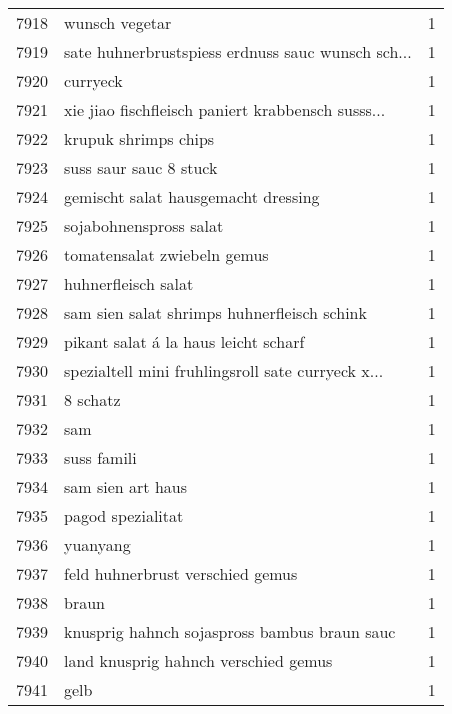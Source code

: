 \begin{tabular}{llr}
7918 &                                     wunsch vegetar &      1 \\
7919 &  sate huhnerbrustspiess erdnuss sauc wunsch sch... &      1 \\
7920 &                                           curryeck &      1 \\
7921 &  xie jiao fischfleisch paniert krabbensch susss... &      1 \\
7922 &                               krupuk shrimps chips &      1 \\
7923 &                             suss saur sauc 8 stuck &      1 \\
7924 &                gemischt salat hausgemacht dressing &      1 \\
7925 &                             sojabohnenspross salat &      1 \\
7926 &                        tomatensalat zwiebeln gemus &      1 \\
7927 &                                huhnerfleisch salat &      1 \\
7928 &        sam sien salat shrimps huhnerfleisch schink &      1 \\
7929 &               pikant salat á la haus leicht scharf &      1 \\
7930 &  spezialtell mini fruhlingsroll sate curryeck x... &      1 \\
7931 &                                           8 schatz &      1 \\
7932 &                                                sam &      1 \\
7933 &                                        suss famili &      1 \\
7934 &                                  sam sien art haus &      1 \\
7935 &                                  pagod spezialitat &      1 \\
7936 &                                           yuanyang &      1 \\
7937 &                   feld huhnerbrust verschied gemus &      1 \\
7938 &                                              braun &      1 \\
7939 &       knusprig hahnch sojaspross bambus braun sauc &      1 \\
7940 &               land knusprig hahnch verschied gemus &      1 \\
7941 &                                               gelb &      1 \\

\end{tabular}
